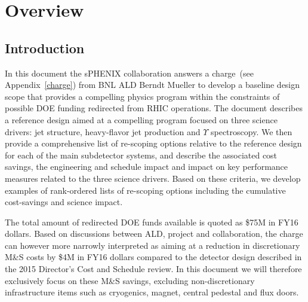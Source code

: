 \chapter*{Overview}
\label{configurations}
\setcounter{page}{1}

\section{Introduction}
In this document the sPHENIX collaboration answers a charge~(see
Appendix~\ref{charge}) from BNL ALD Berndt Mueller to develop
a baseline design scope that provides a compelling physics program
within the constraints of possible DOE funding redirected from 
RHIC operations. The document describes a reference design aimed
at a compelling program focused on three science drivers: jet structure,
heavy-flavor jet production and $\Upsilon$ spectroscopy. We then
provide a comprehensive list of re-scoping options relative 
to the reference design for each
of the main subdetector systems, and describe the associated
cost savings, the engineering and schedule impact and impact on 
key performance measures related to the three science 
drivers. Based on these criteria, we develop examples of 
rank-ordered lists of re-scoping options including the 
cumulative cost-savings and science impact.

The total amount of redirected DOE funds available is quoted as \$75M in FY16 dollars.
Based on discussions between ALD, project and collaboration, the charge can
however more narrowly interpreted as aiming at a reduction in discretionary M\&S costs 
by \$4M in FY16 dollars compared to the detector design described
in the 2015 Director's Cost and Schedule review. In this document we will
therefore exclusively focus on these M\&S savings, excluding non-discretionary 
infrastructure items such as cryogenics, magnet, central pedestal and flux doors.

